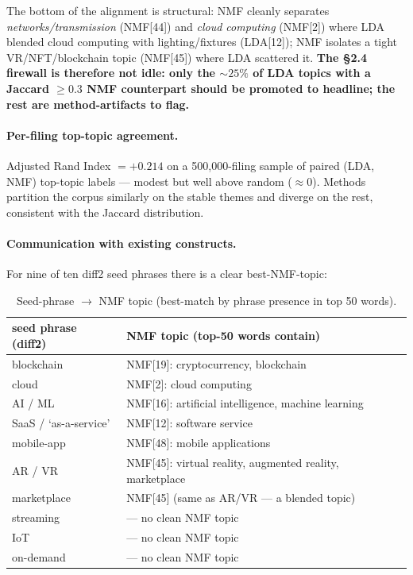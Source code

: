 \documentclass[11pt]{report}
\begin{document}
\noindent The bottom of the alignment is structural: NMF cleanly separates
\emph{networks/transmission} (NMF[44]) and \emph{cloud computing} (NMF[2])
where LDA blended cloud computing with lighting/fixtures (LDA[12]); NMF
isolates a tight VR/NFT/blockchain topic (NMF[45]) where LDA scattered it.
\textbf{The §2.4 firewall is therefore not idle: only the $\sim 25\%$ of LDA
topics with a Jaccard $\geq 0.3$ NMF counterpart should be promoted to
headline; the rest are method-artifacts to flag.}

\paragraph{Per-filing top-topic agreement.} Adjusted Rand Index $=+0.214$ on a
500{,}000-filing sample of paired (LDA, NMF) top-topic labels --- modest but
well above random ($\approx 0$). Methods partition the corpus similarly on
the stable themes and diverge on the rest, consistent with the Jaccard
distribution.

\paragraph{Communication with existing constructs.} For nine of ten diff2 seed
phrases there is a clear best-NMF-topic:

\begin{table}[h]\centering\small
\caption{Seed-phrase $\to$ NMF topic (best-match by phrase presence in top 50 words).}
\begin{tabular}{ll}
\toprule
seed phrase (diff2) & NMF topic (top-50 words contain) \\
\midrule
blockchain    & NMF[19]: cryptocurrency, blockchain \\
cloud         & NMF[2]: cloud computing \\
AI / ML       & NMF[16]: artificial intelligence, machine learning \\
SaaS / `as-a-service' & NMF[12]: software service \\
mobile-app    & NMF[48]: mobile applications \\
AR / VR       & NMF[45]: virtual reality, augmented reality, marketplace \\
marketplace   & NMF[45] (same as AR/VR --- a blended topic) \\
streaming     & --- no clean NMF topic \\
IoT           & --- no clean NMF topic \\
on-demand     & --- no clean NMF topic \\
\bottomrule
\end{tabular}
\end{table}
\end{document}
